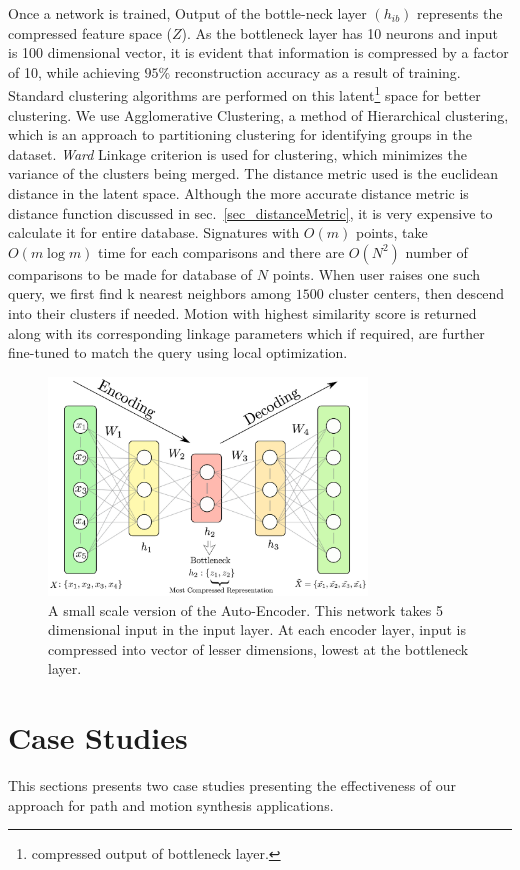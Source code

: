 \documentclass[twocolumn,10pt]{asme2e}
\begin{document}
Once a network is trained, Output of the bottle-neck layer $(h_{ib})$ represents the compressed feature space ($Z$).
As the bottleneck layer has 10 neurons and input is 100 dimensional vector, it is evident that information is compressed by a factor of 10, while achieving $95\%$ reconstruction accuracy as a result of training.
Standard clustering algorithms are performed on this latent\footnote{compressed output of bottleneck layer.} space for better clustering\cite{song2013}.
We use Agglomerative Clustering, a method of Hierarchical clustering, which is an approach to partitioning clustering for identifying groups in the dataset.
\emph{Ward}\cite{ward1963} Linkage criterion is used for clustering, which minimizes the variance of the clusters being merged.
The distance metric used is the euclidean distance in the latent space.
Although the more accurate distance metric is distance function discussed in sec.~\ref{sec_distanceMetric}, it is very expensive to calculate it for entire database.
Signatures with ${O}(m)$ points, take ${O}(m\log{}m)$ time for each comparisons and there are ${O}(N^2)$ number of comparisons to be made for database of $N$ points.
When user raises one such query, we first find k nearest neighbors among $1500$ cluster centers, then descend into their clusters if needed.
Motion with highest similarity score is returned along with its corresponding linkage parameters which if required, are further fine-tuned to match the query using local optimization.

\begin{figure}
\centering
\includegraphics[width=240pt]{figure/fig_auto_encoder.eps}
  \caption{A small scale version of the Auto-Encoder. This network takes 5 dimensional input in the input layer. At each encoder layer, input is compressed into vector of lesser dimensions, lowest at the bottleneck layer.}
\label{autoEncoder}
\end{figure}


\section{Case Studies}\label{sec_example}
This sections presents two case studies presenting the effectiveness of our approach for path and motion synthesis applications.
\end{document}

